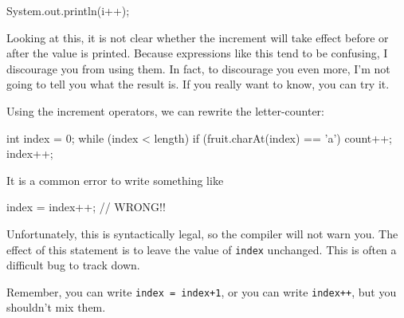 \documentclass{book}
\makeatletter
\renewcommand{\section}{\@startsection 
    {section} {1} {0mm}%
    {-3.5ex \@plus -1ex \@minus -.2ex}%
    {0.7ex \@plus.2ex}%
    {\normalfont\Large\bfseries}}
\makeatother
\begin{document}
\begin{verbatimtab}
    System.out.println(i++);
\end{verbatimtab}
%
Looking at this, it is not clear whether the increment will
take effect before or after the value is printed.  Because
expressions like this tend to be confusing, I discourage
you from using them.  In fact, to discourage you even more,
I'm not going to tell you what the result is.  If you really
want to know, you can try it.

Using the increment operators, we can rewrite the letter-counter:

\begin{verbatimtab}
    int index = 0;
    while (index < length) {
      if (fruit.charAt(index) == 'a') {
        count++;
      }
      index++;
    }
\end{verbatimtab}
%
It is a common error to write something like

\begin{verbatimtab}
    index = index++;             // WRONG!!
\end{verbatimtab}
%
Unfortunately, this is syntactically legal, so the compiler
will not warn you.  The effect of this statement is to leave
the value of {\tt index} unchanged.  This is often a difficult
bug to track down.

Remember, you can write {\tt index = index+1}, or you
can write {\tt index++}, but you shouldn't mix them.




\end{document}
